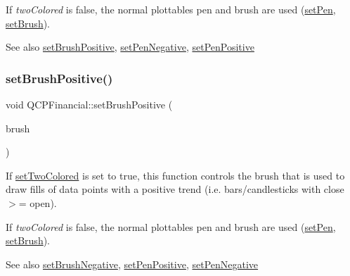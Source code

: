If {\itshape two\+Colored} is false, the normal plottable\textquotesingle{}s pen and brush are used (\hyperlink{class_q_c_p_abstract_plottable_ab74b09ae4c0e7e13142fe4b5bf46cac7}{set\+Pen}, \hyperlink{class_q_c_p_abstract_plottable_a7a4b92144dca6453a1f0f210e27edc74}{set\+Brush}).

\begin{DoxySeeAlso}{See also}
\hyperlink{class_q_c_p_financial_a5ebff2b1764efd07cc44942e67821829}{set\+Brush\+Positive}, \hyperlink{class_q_c_p_financial_afe5c07e94ccea01a75b3a2476993c346}{set\+Pen\+Negative}, \hyperlink{class_q_c_p_financial_ac58aa3adc7a35aab0088764b840683e5}{set\+Pen\+Positive} 
\end{DoxySeeAlso}
\mbox{\label{class_q_c_p_financial_a5ebff2b1764efd07cc44942e67821829}} 
\subsubsection{\texorpdfstring{set\+Brush\+Positive()}{setBrushPositive()}}
{\footnotesize\ttfamily void Q\+C\+P\+Financial\+::set\+Brush\+Positive (\begin{DoxyParamCaption}\item[{const Q\+Brush \&}]{brush }\end{DoxyParamCaption})}

If \hyperlink{class_q_c_p_financial_a138e44aac160a17a9676652e240c5f08}{set\+Two\+Colored} is set to true, this function controls the brush that is used to draw fills of data points with a positive trend (i.\+e. bars/candlesticks with close $>$= open).

If {\itshape two\+Colored} is false, the normal plottable\textquotesingle{}s pen and brush are used (\hyperlink{class_q_c_p_abstract_plottable_ab74b09ae4c0e7e13142fe4b5bf46cac7}{set\+Pen}, \hyperlink{class_q_c_p_abstract_plottable_a7a4b92144dca6453a1f0f210e27edc74}{set\+Brush}).

\begin{DoxySeeAlso}{See also}
\hyperlink{class_q_c_p_financial_a8bbdd87629f9144b3ef51af660c0961a}{set\+Brush\+Negative}, \hyperlink{class_q_c_p_financial_ac58aa3adc7a35aab0088764b840683e5}{set\+Pen\+Positive}, \hyperlink{class_q_c_p_financial_afe5c07e94ccea01a75b3a2476993c346}{set\+Pen\+Negative} 
\end{DoxySeeAlso}
\mbox{\label{class_q_c_p_financial_a5a59175d36279d71596e64d7bb65596f}} 
